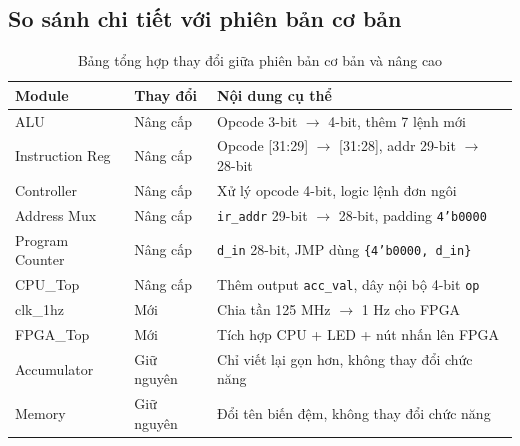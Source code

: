 \subsection{So sánh chi tiết với phiên bản cơ bản}
\begin{table}[H]
\centering
\begin{tabular}{|l|l|l|}
\hline
\textbf{Module} & \textbf{Thay đổi} & \textbf{Nội dung cụ thể} \\
\hline
ALU               & Nâng cấp & Opcode 3-bit $\rightarrow$ 4-bit, thêm 7 lệnh mới \\
Instruction Reg   & Nâng cấp & Opcode [31:29] $\rightarrow$ [31:28], addr 29-bit $\rightarrow$ 28-bit \\
Controller        & Nâng cấp & Xử lý opcode 4-bit, logic lệnh đơn ngôi \\
Address Mux       & Nâng cấp & \texttt{ir\_addr} 29-bit $\rightarrow$ 28-bit, padding \texttt{4'b0000} \\
Program Counter   & Nâng cấp & \texttt{d\_in} 28-bit, JMP dùng \texttt{\{4'b0000, d\_in\}} \\
CPU\_Top          & Nâng cấp & Thêm output \texttt{acc\_val}, dây nội bộ 4-bit \texttt{op} \\
clk\_1hz          & Mới      & Chia tần 125 MHz $\rightarrow$ 1 Hz cho FPGA \\
FPGA\_Top         & Mới      & Tích hợp CPU + LED + nút nhấn lên FPGA \\
Accumulator  & Giữ nguyên & Chỉ viết lại gọn hơn, không thay đổi chức năng \\
Memory       & Giữ nguyên & Đổi tên biến đệm, không thay đổi chức năng     \\
\hline
\end{tabular}
\caption{Bảng tổng hợp thay đổi giữa phiên bản cơ bản và nâng cao}
\label{tab:module_changes}
\end{table}